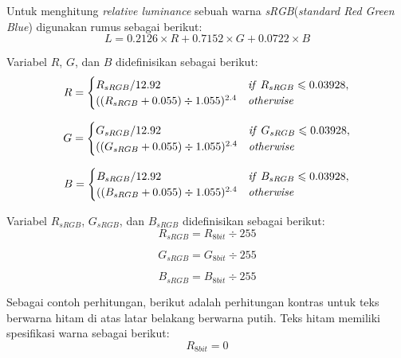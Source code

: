 Untuk menghitung \textit{relative luminance} sebuah warna \textit{sRGB}(\textit{standard Red Green Blue}) digunakan rumus sebagai berikut:
\begin{equation}
L = 0.2126 \times R + 0.7152 \times G + 0.0722 \times B
\end{equation}

Variabel $R$, $G$, dan $B$ didefinisikan sebagai berikut:
\begin{equation}
R = \begin{cases}
R_{sRGB}/12.92 & \text{\textit{if} $R_{sRGB} \leqslant 0.03928$}, \\
((R_{sRGB} + 0.055)\div 1.055)^{2.4} & \text{\textit{otherwise}}
\end{cases}
\end{equation}

\begin{equation}
G = \begin{cases}
G_{sRGB}/12.92 & \text{\textit{if} $G_{sRGB} \leqslant 0.03928$}, \\
((G_{sRGB} + 0.055)\div 1.055)^{2.4} & \text{\textit{otherwise}}
\end{cases}
\end{equation}

\begin{equation}
B = \begin{cases}
B_{sRGB}/12.92 & \text{\textit{if} $B_{sRGB} \leqslant 0.03928$}, \\
((B_{sRGB} + 0.055)\div 1.055)^{2.4} & \text{\textit{otherwise}}
\end{cases}
\end{equation}

Variabel $R_{sRGB}$, $G_{sRGB}$, dan $B_{sRGB}$ didefinisikan sebagai berikut:
\begin{equation}
R_{sRGB} = R_{8bit} \div 255
\end{equation}

\begin{equation}
G_{sRGB} = G_{8bit} \div 255
\end{equation}

\begin{equation}
B_{sRGB} = B_{8bit} \div 255
\end{equation}

Sebagai contoh perhitungan, berikut adalah perhitungan kontras untuk teks berwarna hitam di atas latar belakang berwarna putih. Teks hitam memiliki spesifikasi warna sebagai berikut:
\begin{equation}
R_{8bit} = 0
\end{equation}

